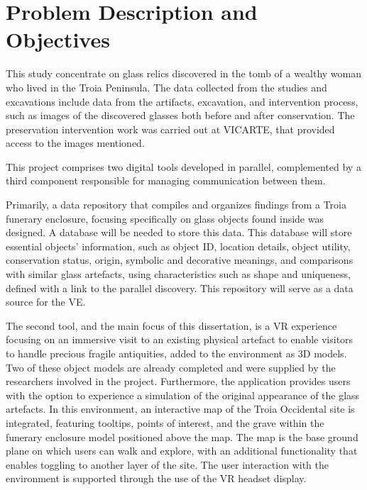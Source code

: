 
\section{Problem Description and Objectives}
\label{sec:problem_description} 
This study concentrate on glass relics discovered in the tomb of a wealthy woman who lived in the Troia Peninsula. The data collected from the studies and excavations include 
data from the artifacts, excavation, and intervention process, such as images of the discovered glasses both before and after conservation. 
The preservation intervention work was carried out at \gls{VICARTE}, that provided access to the images mentioned.

This project comprises two digital tools developed in parallel, complemented by a third component responsible for managing communication between them.

Primarily, a data repository that compiles and organizes findings from 
a Troia funerary enclosure, focusing specifically on glass objects found inside was designed. A database will be needed to store this data. 
This database will store essential objects' information, such as object ID, location details, object utility,
conservation status, origin, symbolic and decorative meanings, and comparisons with similar glass artefacts, using characteristics such as shape and uniqueness, defined with a link to the parallel discovery. 
This repository will serve as a data source for the \gls{VE}.

The second tool, and the main focus of this dissertation, is a \gls{VR} experience focusing on an immersive visit to an existing physical 
artefact to enable visitors to handle precious fragile antiquities, added to the environment as \gls{3D} models. 
Two of these object models are already completed and were supplied by the researchers involved in the project.
Furthermore, the application provides users with the option to experience a simulation of the original appearance of the glass artefacts.
In this environment, an interactive map of the Troia Occidental site is integrated, featuring tooltips, points of interest, and the grave within the funerary enclosure model positioned above the map. 
The map is the base ground plane on which users can walk and explore, with an additional functionality that enables toggling to another layer of the site.
The user interaction with the environment is supported through the use of the \gls{VR} headset display.

